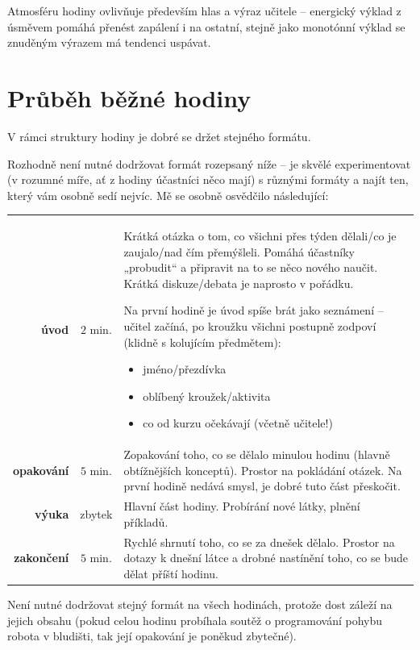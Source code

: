 Atmosféru hodiny ovlivňuje především hlas a výraz učitele -- energický výklad z úsměvem pomáhá přenést zapálení i na ostatní, stejně jako monotónní výklad se znuděným výrazem má tendenci uspávat.

\section{Průběh běžné hodiny}
V rámci struktury hodiny je dobré se držet stejného formátu.

Rozhodně není nutné dodržovat formát rozepsaný níže -- je skvělé experimentovat (v rozumné míře, ať z hodiny účastníci něco mají) s různými formáty a najít ten, který vám osobně sedí nejvíc. Mě se osobně osvědčilo následující:

\begin{table}[h!]
	\begin{tabularx}{\textwidth}{rc>{\setlength{\parskip}{0.5\baselineskip}}X} \toprule
		\textbf{úvod} & $2$ min. & Krátká otázka o tom, co všichni přes týden dělali/co je zaujalo/nad čím přemýšleli. Pomáhá účastníky „probudit“ a připravit na to se něco nového naučit. Krátká diskuze/debata je naprosto v pořádku.

		Na první hodině je úvod spíše brát jako seznámení -- učitel začíná, po kroužku všichni postupně zodpoví (klidně s kolujícím předmětem):
		\begin{itemize}[label=\textbullet, leftmargin=20pt,
							after*={\mbox{}\vspace{-\baselineskip}}]
			\item jméno/přezdívka
			\item oblíbený kroužek/aktivita
			\item co od kurzu očekávají (včetně učitele!)
		\end{itemize}
		\\
		\noalign{\vspace{8pt}}
		\textbf{opakování} & $5$ min. & Zopakování toho, co se dělalo minulou hodinu (hlavně obtížnějších konceptů). Prostor na pokládání otázek. Na první hodině nedává smysl, je dobré tuto část přeskočit. \\
		\noalign{\vspace{8pt}}
		\textbf{výuka} & zbytek &  Hlavní část hodiny. Probírání nové látky, plnění příkladů. \\
		\noalign{\vspace{8pt}}
		\textbf{zakončení} & $5$ min. & Rychlé shrnutí toho, co se za dnešek dělalo. Prostor na dotazy k dnešní látce a drobné nastínění toho, co se bude dělat příští hodinu. \\
		\bottomrule
	\end{tabularx}
\end{table}

Není nutné dodržovat stejný formát na všech hodinách, protože dost záleží na jejich obsahu (pokud celou hodinu probíhala soutěž o programování pohybu robota v bludišti, tak její opakování je poněkud zbytečné).


